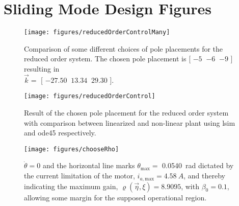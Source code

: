 \section{Sliding Mode Design Figures}\label{slidingModeDesignFigures}
\vspace{-.2cm}
\begin{adjustwidth}{-1.1cm}{-1.1cm}
  \begin{minipage}{\textwidth}
    \begin{minipage}{0.58\textwidth}
      \begin{figure}[H]
        \texttt{[image: figures/reducedOrderControlMany]}
        \caption{Comparison of some different choices of pole placements for the reduced order system. The chosen pole placement is [ $-5\ $ $-6\ $ $-9$ ] resulting in \\ $\vec{k} =$ [ $-27.50\ $ $13.34\ $ $29.30$ ].}
        \label{fig:reducedOrderControlMany}
      \end{figure}
    \end{minipage}
    \begin{minipage}{0.58\textwidth}
      \begin{figure}[H]
        \texttt{[image: figures/reducedOrderControl]}
        \caption{Result of the chosen pole placement for the reduced order system with comparison between linearized and non-linear plant using lsim and ode45 respectively.\\ \vspace{14pt}}
        \label{fig:reducedOrderControl}
      \end{figure}
    \end{minipage}
  \end{minipage}
\end{adjustwidth}
\vspace{.5cm}

\begin{figure}[H]
  \texttt{[image: figures/chooseRho]}
  \caption{$\dot{\theta}=0$ and the horizontal line marks $\theta_\mathrm{max} =$ \SI{0.0540}{rad} dictated by the current limitation of the motor, $i_{a,\mathrm{max}} = \SI{4.58}{A}$, and thereby indicating the maximum gain, $\varrho(\vec{\eta},\xi) = 8.9095$, with $\beta_0=0.1$, allowing some margin for the supposed operational region.}
  \label{fig:chooseRho}
\end{figure}
